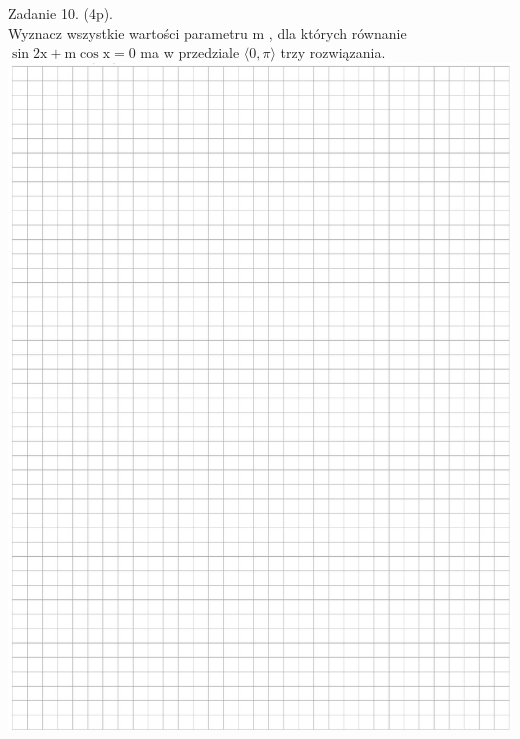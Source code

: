 \documentclass[10pt]{article}
\begin{document}
Zadanie 10. (4p).\\
Wyznacz wszystkie wartości parametru m , dla których równanie \(\sin 2 \mathrm{x}+\mathrm{m} \cos \mathrm{x}=0\) ma w przedziale \(\langle 0, \pi\rangle\) trzy rozwiązania.\\
\includegraphics[max width=\textwidth, center]{2024_11_21_498389c978c770348ebcg-08}
\end{document}

